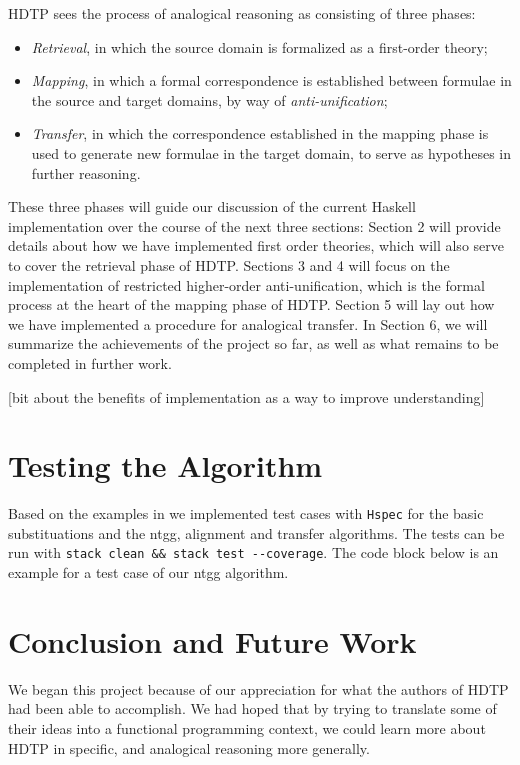 \documentclass[12pt,a4paper]{article}
\begin{document}
HDTP sees the process of analogical reasoning as consisting of three phases: 
\begin{itemize}
    \item \textit{Retrieval}, in which the source domain is formalized as a first-order theory;
    \item \textit{Mapping}, in which a formal correspondence is established between formulae in the source and target domains, by way of \textit{anti-unification};
    \item \textit{Transfer}, in which the correspondence established in the mapping phase is used to generate new formulae in the target domain, to serve as hypotheses in further reasoning.
\end{itemize} 

These three phases will guide our discussion of the current Haskell implementation over the course of the next three sections: Section 2 will provide details about how we have implemented first order theories, which will also serve to cover the retrieval phase of HDTP. Sections 3 and 4 will focus on the implementation of restricted higher-order anti-unification, which is the formal process at the heart of the mapping phase of HDTP. Section 5 will lay out how we have implemented a procedure for analogical transfer. In Section 6, we will summarize the achievements of the project so far, as well as what remains to be completed in further work.
% 

[bit about the benefits of implementation as a way to improve understanding]



\section{Testing the Algorithm}

Based on the examples in \cite{Schmidt-2014} we implemented test cases with \texttt{Hspec} for the basic substituations and the ntgg, alignment and transfer algorithms. The tests can be run with \verb|stack clean && stack test --coverage|. The code block below is an example for a test case of our ntgg algorithm.
\vspace{2mm}


\section{Conclusion and Future Work}

We began this project because of our appreciation for what the authors of HDTP had been able to accomplish. We had hoped that by trying to translate some of their ideas into a functional programming context, we could learn more about HDTP in specific, and analogical reasoning more generally.
\end{document}
